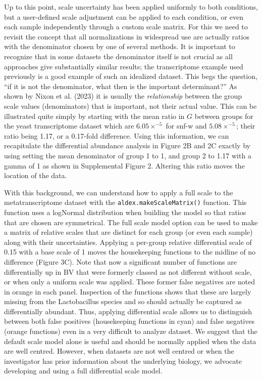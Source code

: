 \documentclass[
]{article}
\begin{document}
Up to this point, scale uncertainty has been applied uniformly to both
conditions, but a user-defined scale adjustment can be applied to each
condition, or even each sample independently through a custom scale
matrix. For this we need to revisit the concept that all normalizations
in widespread use are actually ratios with the denominator chosen by one
of several methods. It is important to recognize that in some datasets
the denominator itself is not crucial as all approaches give
substantially similar results; the transcriptome example used previously
is a good example of such an idealized dataset. This begs the question,
``if it is not the denominator, what then is the important
determinant?'' As shown by Nixon et al. (2023) it is usually the
\emph{relationship} between the group scale values (denominators) that
is important, not their actual value. This can be illustrated quite
simply by starting with the mean ratio in \(G\) between groups for the
yeast transcriptome dataset which are \(6.05\times^{-5}\) for snf-w and
\(5.08\times^{-5}\); their ratio being 1.17, or a 0.17-fold difference.
Using this information, we can recapitulate the differential abundance
analysis in Figure 2B and 2C exactly by using setting the mean
denominator of group 1 to 1, and group 2 to 1.17 with a gamma of 1 as
shown in Supplemental Figure 2. Altering this ratio moves the location
of the data.

With this background, we can understand how to apply a full scale to the
metatranscriptome dataset with the \texttt{aldex.makeScaleMatrix()}
function. This function uses a logNormal distribution when building the
model so that ratios that are chosen are symmetrical. The full scale
model option can be used to make a matrix of relative scales that are
distinct for each group (or even each sample) along with their
uncertainties. Applying a per-group relative differential scale of 0.15
with a base scale of 1 moves the housekeeping functions to the midline
of no difference (Figure 3C). Note that now a significant number of
functions are differentially up in BV that were formerly classed as not
different without scale, or when only a uniform scale was applied. These
former false negatives are noted in orange in each panel. Inspection of
the functions shows that these are largely missing from the
Lactobacillus species and so should actually be captured as
differentially abundant. Thus, applying differential scale allows us to
distinguish between both false positives (housekeeping functions in
cyan) and false negatives (orange functions) even in a very difficult to
analyze dataset. We suggest that the default scale model alone is useful
and should be normally applied when the data are well centred. However,
when datasets are not well centred or when the investigator has prior
information about the underlying biology, we advocate developing and
using a full differential scale model.
\end{document}

